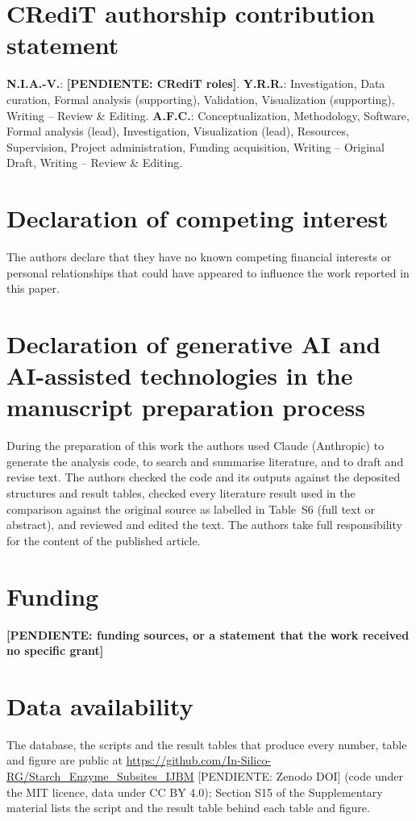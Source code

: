 \documentclass[preprint,12pt]{elsarticle}
\newcommand{\pend}[1]{\textbf{[PENDIENTE: #1]}}
\begin{document}
\section*{CRediT authorship contribution statement}
\textbf{N.I.A.-V.}: \pend{CRediT roles}.
\textbf{Y.R.R.}: Investigation, Data curation, Formal analysis (supporting), Validation, Visualization
(supporting), Writing -- Review \& Editing.
\textbf{A.F.C.}: Conceptualization, Methodology, Software, Formal analysis (lead), Investigation,
Visualization (lead), Resources, Supervision, Project administration, Funding acquisition, Writing --
Original Draft, Writing -- Review \& Editing.

\section*{Declaration of competing interest}
The authors declare that they have no known competing financial interests or personal relationships that could have
appeared to influence the work reported in this paper.

\section*{Declaration of generative AI and AI-assisted technologies in the manuscript preparation process}
During the preparation of this work the authors used Claude (Anthropic) to generate the analysis code, to search and
summarise literature, and to draft and revise text. The authors checked the code and its outputs against the
deposited structures and result tables, checked every literature result used in the comparison against the original
source as labelled in Table~S6 (full text or abstract), and reviewed and edited the text. The authors take full
responsibility for the content of the published article.

\section*{Funding}
\pend{funding sources, or a statement that the work received no specific grant}

\section*{Data availability}
The database, the scripts and the result tables that produce every number, table and figure are
public at \url{https://github.com/In-Silico-RG/Starch_Enzyme_Subsites_IJBM} [PENDIENTE: Zenodo DOI]
(code under the MIT licence, data under CC BY 4.0); Section S15 of the Supplementary material lists the script and
the result table behind each table and figure.
\end{document}
